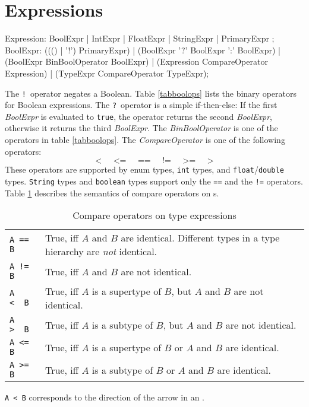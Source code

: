 \section{Expressions}
\label{expressions}
\begin{rail}
  Expression: BoolExpr | IntExpr | FloatExpr | StringExpr | PrimaryExpr ;  
  BoolExpr: ((() | '!') PrimaryExpr) | (BoolExpr '?' BoolExpr ':' BoolExpr) | (BoolExpr BinBoolOperator BoolExpr) | (Expression CompareOperator Expression) | (TypeExpr CompareOperator TypeExpr);
\end{rail}
The \texttt{!}\ operator negates a Boolean. 
Table \ref{tabboolops} lists the binary operators for Boolean expressions. 
The \texttt{?}\ operator is a simple if-then-else: If the first \emph{BoolExpr} is evaluated to \texttt{true}, the operator returns the second \emph{BoolExpr}, otherwise it returns the third \emph{BoolExpr}.
The \emph{BinBoolOperator} is one of the operators in table \ref{tabboolops}.
The \emph{CompareOperator} is one of the following operators:
\[ \texttt{<} \;\;\;\;\; \texttt{<=} \;\;\;\;\; \texttt{==} \;\;\;\;\; \texttt{!=} \;\;\;\;\; \texttt{>=} \;\;\;\;\; \texttt{>} \]
These operators are supported by enum types, \texttt{int} types, and \texttt{float}/\texttt{double} types.
\texttt{String} types and \texttt{boolean} types support only the \texttt{==} and the \texttt{!=} operators.
Table \ref{compandtypes} describes the semantics of compare operators on s.
\begin{table}[htbp]
  \centering
  \begin{tabularx}{\linewidth}{|l|X|} \hline
    \texttt{A == B} & True, iff $A$ and $B$ are identical. Different types in a type hierarchy are \emph{not} identical. \\
    \texttt{A != B} & True, iff $A$ and $B$ are not identical. \\
    \texttt{A <\ \ B} & True, iff $A$ is a supertype of $B$, but $A$ and $B$ are not identical. \\
    \texttt{A >\ \ B} & True, iff $A$ is a subtype of $B$, but $A$ and $B$ are not identical. \\
    \texttt{A <= B} & True, iff $A$ is a supertype of $B$ or $A$ and $B$ are identical. \\
    \texttt{A >= B} & True, iff $A$ is a subtype of $B$ or $A$ and $B$ are identical. \\ \hline
  \end{tabularx}
  \caption{Compare operators on type expressions}
  \label{compandtypes}
\end{table}
\begin{note}
  \texttt{A < B} corresponds to the direction of the arrow in an .
\end{note}

